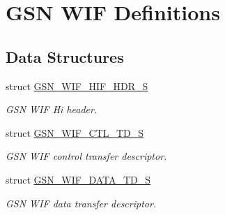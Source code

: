 \hypertarget{a00638}{
\section{GSN WIF Definitions}
\label{a00638}
}
\subsection*{Data Structures}
\begin{DoxyCompactItemize}
\item 
struct \hyperlink{a00337}{GSN\_\-WIF\_\-HIF\_\-HDR\_\-S}
\begin{DoxyCompactList}\small\item\em GSN WIF Hi header. \end{DoxyCompactList}\item 
struct \hyperlink{a00322}{GSN\_\-WIF\_\-CTL\_\-TD\_\-S}
\begin{DoxyCompactList}\small\item\em GSN WIF control transfer descriptor. \end{DoxyCompactList}\item 
struct \hyperlink{a00325}{GSN\_\-WIF\_\-DATA\_\-TD\_\-S}
\begin{DoxyCompactList}\small\item\em GSN WIF data transfer descriptor. \end{DoxyCompactList}\end{DoxyCompactItemize}
